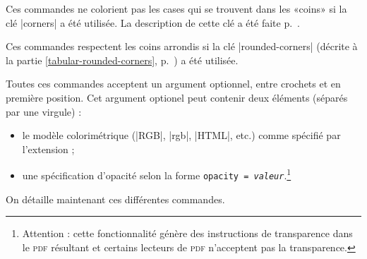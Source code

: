 \documentclass[dvipsnames]{article}%
\begin{document}
\label{code-before}



\medskip
Ces commandes ne colorient pas les cases qui se trouvent dans les «coins» si la
clé |corners| a été utilisée. La description de cette clé a été faite
p.~\pageref{corners}.

\medskip
Ces commandes respectent les coins arrondis si la clé |rounded-corners| (décrite
à la partie \ref{tabular-rounded-corners}, p.~\pageref{tabular-rounded-corners})
a été utilisée.

\medskip
Toutes ces commandes acceptent un argument optionnel, entre crochets et en
première position. Cet argument optionel peut contenir deux éléments (séparés
par une virgule) :
\begin{itemize}
\item le modèle colorimétrique (|RGB|, |rgb|, |HTML|, etc.) comme spécifié par
l'extension  ;
\item {}
une spécification d'opacité selon la forme \texttt{opacity =
  \textsl{valeur}}.\footnote{Attention : cette fonctionnalité génère des instructions de
  transparence dans le \textsc{pdf} résultant et certains lecteurs de
  \textsc{pdf} n'acceptent pas la transparence.}
\end{itemize}


\medskip
On détaille maintenant ces différentes commandes.
\end{document}
